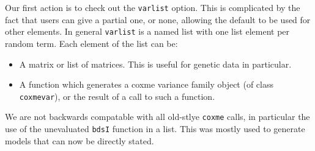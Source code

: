 \documentclass{article}
\begin{document}
Our first action is to check out the \Verb!varlist! option.  This is 
complicated by the fact that users can give a partial one, or none,
allowing the default to be used for other elements.
In general \Verb!varlist! is a named list with one list element per
random term.  Each element of the list can be:
\begin{itemize}
  \item A matrix or list of matrices.  This is useful for genetic
    data in particular.
  \item A function which generates a coxme variance family object (of class
    \Verb!coxmevar!), or the result of a call to such a function.
\end{itemize}
We are not backwards compatable with all old-stlye \Verb!coxme! calls,
in particular the use of the unevaluated \Verb!bdsI! function in a list.
This was mostly used to generate models that can now be directly stated.
\end{document}
